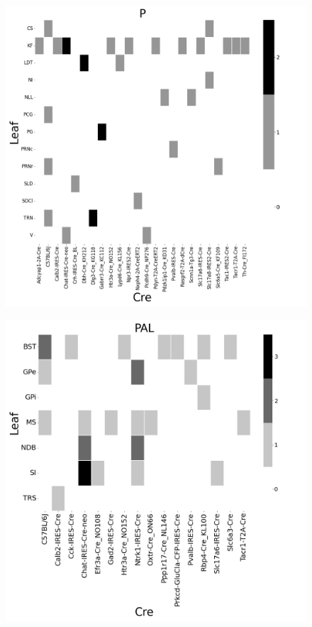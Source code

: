\begin{figure}[H]
    \centering
    \includegraphics[width = 7in]{figs/P centroid density.png}
    \label{fig:my_label}
\end{figure}
\newpage

\begin{figure}[H]
    \centering
    \includegraphics[width = 7in]{figs/PAL centroid density.png} 
    \label{fig:my_label}
\end{figure}
\newpage

